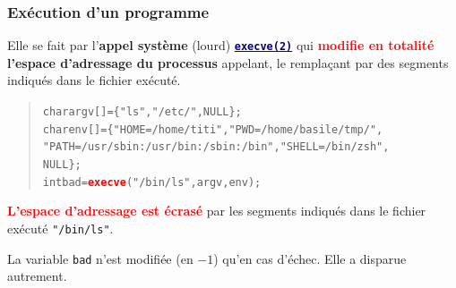 \documentclass[lualatex,11pt,a4paper,svgnames,french]{beamer}
\newcommand{\clbrougras}[1]{{\textcolor{Red}{\textbf{#1}}}}
\begin{document}
\begin{frame}\frametitle{Exécution d'un programme}
  Elle se fait par l'\textbf{appel système} (lourd)
  {\href{https://man7.org/linux/man-pages/man2/execve.2.html}{\texttt{\textcolor{Navy}{\textbf{execve(2)}}}}}
  qui \clbrougras{modifie en totalité} \textbf{l'espace d'adressage du processus} appelant, le remplaçant par des segments indiqués dans le fichier exécuté.

  \begin{relsize}{-0.5}
  \begin{quote}
    \begin{alltt}
      char argv[] = \{ "ls", "/etc/", NULL \};\\
      char env[] = \{ "HOME=/home/titi", "PWD=/home/basile/tmp/",\\
      "PATH=/usr/sbin:/usr/bin:/sbin:/bin", "SHELL=/bin/zsh", \\   NULL \};\\
      int bad = \clbrougras{execve}("/bin/ls", argv, env);
    \end{alltt}
  \end{quote}
  \end{relsize}

  \clbrougras{L'espace d'adressage est écrasé} par les segments indiqués dans le fichier exécuté \texttt{"/bin/ls"}.

  La variable \texttt{bad} n'est modifiée (en $-1$) qu'en cas d'échec. Elle a disparue autrement.
\end{frame}
\end{document}
